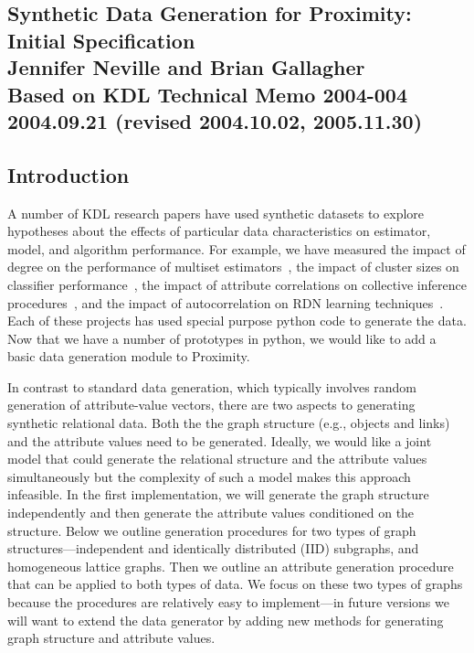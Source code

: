 \documentclass[11pt]{article}
\begin{document}
\subsection*{Synthetic Data Generation for Proximity: Initial Specification\\
Jennifer Neville and Brian Gallagher\\[6pt]
\small{Based on KDL Technical Memo 2004-004\\
2004.09.21 (revised 2004.10.02, 2005.11.30)}
}

\vspace{-1.mm}
\subsection*{Introduction}
\vspace{-4.mm}
A number of KDL research papers have used synthetic datasets to explore hypotheses about the effects of particular data characteristics on estimator, model, and algorithm performance. For example, we have measured the impact of degree on the performance of multiset estimators~\cite{neville-icdm03}, the impact of cluster sizes on classifier performance~\cite{jensen-kdd03}, the impact of attribute correlations on collective inference procedures~\cite{jensen-kdd04}, and the impact of autocorrelation on RDN learning techniques~\cite{neville-icdm04}. Each of these projects has used special purpose python code to generate the data. Now that we have a number of prototypes in python, we would like to add a basic data generation module to Proximity.

In contrast to standard data generation, which typically involves random generation of attribute-value vectors, there are two aspects to generating synthetic relational data. Both the the graph structure (e.g., objects and links) and the attribute values need to be generated. Ideally, we would like a joint model that could generate the relational structure and the attribute values simultaneously but the complexity of such a model makes this approach infeasible. In the first implementation, we will generate the graph structure independently and then generate the attribute values conditioned on the structure. Below we outline generation procedures for two types of graph structures---independent and identically distributed (IID) subgraphs, and homogeneous lattice graphs. Then we outline an attribute generation procedure that can be applied to both types of data. We focus on these two types of graphs because the procedures are relatively easy to implement---in future versions we will want to extend the data generator by adding new methods for generating graph structure and attribute values.
\end{document}
